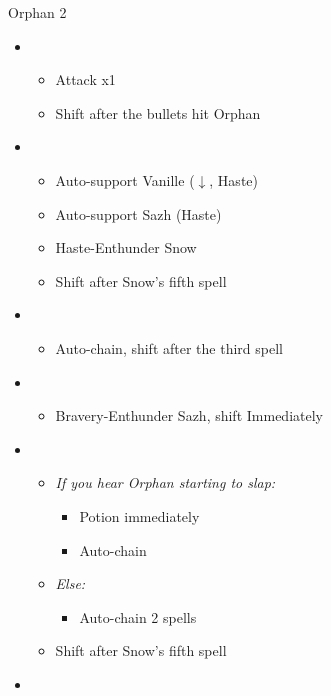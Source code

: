 \begin{battle}[1:05]{Orphan 2}
	\begin{multicols}{2}
		\begin{itemize}
			\item \second
			      \begin{itemize}
				      \item Attack x1
				      \item Shift after the bullets hit Orphan
			      \end{itemize}
			\item \fourth
			      \begin{itemize}
				      \item Auto-support Vanille ($\downarrow$, Haste)
				      \item Auto-support Sazh (Haste)
				      \item Haste-Enthunder Snow
				      \item Shift after Snow's fifth spell
			      \end{itemize}
			\item \sixth
			      \begin{itemize}
				      \item Auto-chain, shift after the third spell
			      \end{itemize}
			\item \fourth
			      \begin{itemize}
				      \item Bravery-Enthunder Sazh, shift Immediately
			      \end{itemize}
			      \columnbreak
			\item \sixth
			      \begin{itemize}
				      \item \textit{If you hear Orphan starting to slap:}
				      \begin{itemize}
					\item Potion immediately
				      	\item Auto-chain
				      \end{itemize}
				      \item \textit{Else:}
				      \begin{itemize}
					\item Auto-chain 2 spells
				      \end{itemize}
				      \item Shift after Snow's fifth spell
			      \end{itemize}
			\item \fifth

\end{itemize}
\end{multicols}
\end{battle}
